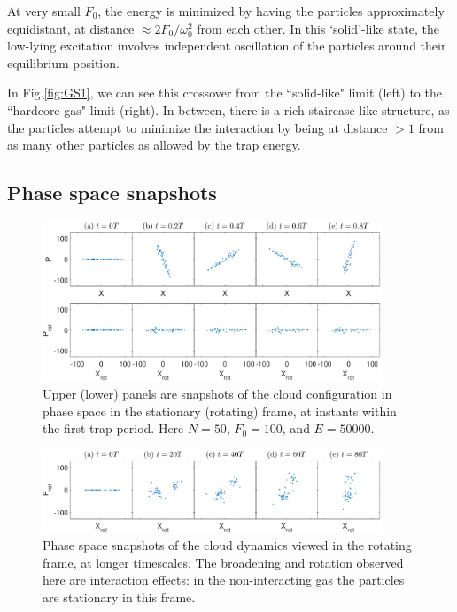 \documentclass[aps,preprintnumbers,onecolumn,amsmath,amssymb,floatfix,pra]{revtex4-1}
\begin{document}
At very small $F_0$, the energy is minimized by having the particles approximately equidistant, at
distance $\approx 2F_0/\omega_0^2$ from each other.  In this `solid'-like state, the low-lying
excitation involves independent oscillation of the particles around their equilibrium position.

In Fig.\ref{fig:GS1}, we can see this crossover from the ``solid-like" limit (left) to the
``hardcore gas" limit (right).  In between, there is a rich staircase-like structure, as the
particles attempt to minimize the interaction by being at distance $>1$ from as many other particles
as allowed by the trap energy.


\subsection{Phase space snapshots}


\begin{figure}[h]
\includegraphics[width=0.9\textwidth]{ZhiyuPictures/stationary_and_rotating_frame_t=1-5_5T.eps}
%
\caption{Upper (lower) panels are snapshots of the cloud configuration in phase space in the
  stationary (rotating) frame, at instants within the first trap period.  Here $N=50$, $F_0=100$,
  and $E=50000$.  }
\label{fig:Breathingfrequency2_0}
\end{figure}


\begin{figure}
\includegraphics[width=0.9\textwidth]{ZhiyuPictures/rotating_frame_t=0-80T.eps}  
\caption{Phase space snapshots of the cloud dynamics viewed in the rotating frame, at longer
  timescales.  The broadening and rotation observed here are interaction effects: in the
  non-interacting gas the particles are stationary in this frame.}
\label{fig:Breathingfrequency2_1}
\end{figure}
\end{document}
